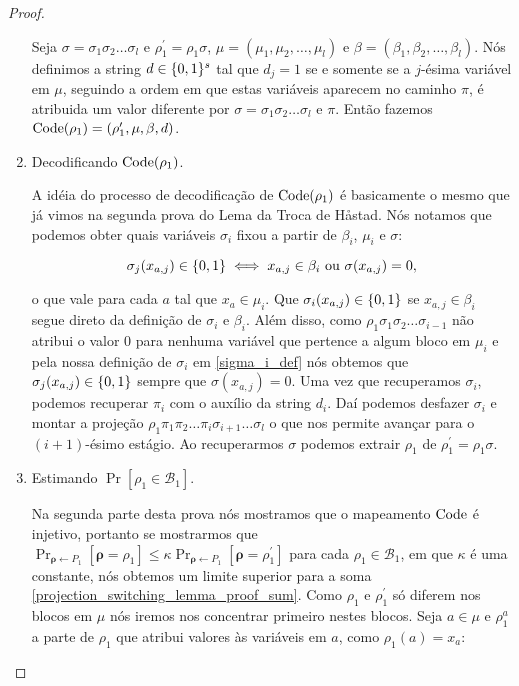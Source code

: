 \begin{proof}
\begin{enumerate}
	Seja $\sigma = \sigma_{1}\sigma_{2}\dots\sigma_{l}$ e $\rho_{1}^{\prime} = \rho_{1}\sigma$, $\mu = (\mu_{1}, \mu_{2}, \dots, \mu_{l})$ e $\beta = (\beta_{1}, \beta_{2}, \dots, \beta_{l})$. Nós definimos a string $d \in \{0, 1\}^{s}$ tal que $d_{j} = 1$ se e somente se a $j$-ésima variável em $\mu$, seguindo a ordem em que estas variáveis aparecem no caminho $\pi$, é atribuida um valor diferente por $\sigma = \sigma_{1}\sigma_{2}\dots\sigma_{l}$ e $\pi$. Então fazemos $\text{Code}(\rho_{1}) = (\rho_{1}^{\prime}, \mu, \beta, d)$.
	
	\item Decodificando $\text{Code}(\rho_{1})$.

	A idéia do processo de decodificação de $\text{Code}(\rho_{1})$ é basicamente o mesmo que já vimos na segunda prova do Lema da Troca de Håstad. Nós notamos que podemos obter quais variáveis $\sigma_{i}$ fixou a partir de $\beta_{i}$, $\mu_{i}$ e $\sigma$:
	
	\begin{equation*}
		\sigma_{j}(x_{a, j}) \in \{0, 1\} \iff x_{a, j} \in \beta_{i} \text{ ou } \sigma(x_{a, j}) = 0,
	\end{equation*}

	o que vale para cada $a$ tal que $x_{a} \in \mu_{i}$. Que $\sigma_{i}(x_{a, j}) \in \{0, 1\}$ se $x_{a, j} \in \beta_{i}$ segue direto da definição de $\sigma_{i}$ e $\beta_{i}$. Além disso, como $\rho_{1}\sigma_{1}\sigma_{2}\dots\sigma_{i - 1}$ não atribui o valor 0 para nenhuma variável que pertence a algum bloco em $\mu_{i}$ e pela nossa definição de $\sigma_{i}$ em \ref{sigma_i_def} nós obtemos que $\sigma_{j}(x_{a, j}) \in \{0, 1\}$ sempre que $\sigma(x_{a, j}) = 0$. Uma vez que recuperamos $\sigma_{i}$, podemos recuperar $\pi_{i}$ com o auxílio da string $d_{i}$. Daí podemos desfazer $\sigma_{i}$ e montar a projeção $\rho_{1}\pi_{1}\pi_{2}\dots\pi_{i}\sigma_{i + 1}\dots\sigma_{l}$ o que nos permite avançar para o $(i + 1)$-ésimo estágio. Ao recuperarmos $\sigma$ podemos extrair $\rho_{1}$ de $\rho_{1}^{\prime} = \rho_{1}\sigma$.
	
	\item Estimando $\Pr[\rho_{1} \in \mathcal{B}_{1}]$.
	
	Na segunda parte desta prova nós mostramos que o mapeamento $\text{Code}$ é injetivo, portanto se mostrarmos que $\Pr_{\boldsymbol{\rho} \leftarrow P_{1}}[\boldsymbol{\rho} = \rho_{1}] \leq \kappa\Pr_{\boldsymbol{\rho} \leftarrow P_{1}}[\boldsymbol{\rho} = \rho_{1}^{\prime}]$ para cada $\rho_{1} \in \mathcal{B}_{1}$, em que $\kappa$ é uma constante, nós obtemos um limite superior para a soma \ref{projection_switching_lemma_proof_sum}. Como $\rho_{1}$ e $\rho_{1}^{\prime}$ só diferem nos blocos em $\mu$ nós iremos nos concentrar primeiro nestes blocos. Seja $a \in \mu$ e $\rho_{1}^{a}$ a parte de $\rho_{1}$ que atribui valores às variáveis em $a$, como $\rho_{1}(a) = x_{a}$:
	

\end{enumerate}
\end{proof}

